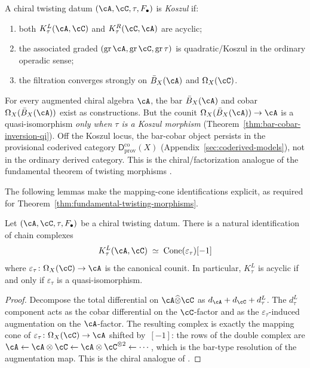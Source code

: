 \begin{definition}\label{def:chiral-koszul-morphism}
A chiral twisting datum $(\cA, \cC, \tau, F_\bullet)$ is
\emph{Koszul} if:
\begin{enumerate}
\item both $K_\tau^L(\cA,\cC)$ and $K_\tau^R(\cC,\cA)$ are acyclic;
\item the associated graded
  $(\operatorname{gr}\cA, \operatorname{gr}\cC, \operatorname{gr}\tau)$
  is quadratic/Koszul in the ordinary operadic sense;
\item the filtration converges strongly on $\bar{B}_X(\cA)$ and
  $\Omega_X(\cC)$.
\end{enumerate}
\end{definition}

\begin{remark}\label{rem:construction-vs-resolution}
For every augmented chiral algebra $\cA$, the bar
$\bar{B}_X(\cA)$ and cobar $\Omega_X(\bar{B}_X(\cA))$ exist as
constructions.  But the counit
$\Omega_X(\bar{B}_X(\cA)) \to \cA$ is a quasi-isomorphism
\emph{only when $\tau$ is a Koszul morphism}
(Theorem~\ref{thm:bar-cobar-inversion-qi}).
Off the Koszul locus, the bar-cobar object persists in the
provisional coderived category
$\mathsf{D}^{\mathrm{co}}_{\mathrm{prov}}(X)$
(Appendix~\ref{sec:coderived-models}),
not in the ordinary derived category.
This is the chiral/factorization analogue of the fundamental
theorem of twisting morphisms \cite[Theorem~2.3.1]{LV12}.
\end{remark}

The following lemmas make the mapping-cone identifications
explicit, as required for Theorem~\ref{thm:fundamental-twisting-morphisms}.

\begin{lemma}
\label{lem:twisted-product-cone-counit}
Let $(\cA, \cC, \tau, F_\bullet)$ be a chiral twisting datum.
There is a natural identification of chain complexes
\[
K_\tau^L(\cA,\cC) \;\simeq\; \operatorname{Cone}(\varepsilon_\tau)[-1]
\]
where $\varepsilon_\tau\colon \Omega_X(\cC) \to \cA$ is the
canonical counit.  In particular, $K_\tau^L$ is acyclic if and
only if $\varepsilon_\tau$ is a quasi-isomorphism.
\end{lemma}

\begin{proof}
Decompose the total differential on $\cA \widehat{\otimes} \cC$
as $d_\cA + d_\cC + d_\tau^L$.  The $d_\tau^L$ component acts as
the cobar differential on the $\cC$-factor and as the
$\varepsilon_\tau$-induced augmentation on the $\cA$-factor.
The resulting complex is exactly the mapping cone of
$\varepsilon_\tau\colon \Omega_X(\cC) \to \cA$ shifted by~$[-1]$:
the rows of the double complex are
$\cA \leftarrow \cA \otimes \cC \leftarrow \cA \otimes \cC^{\otimes 2}
\leftarrow \cdots$, which is the bar-type resolution of the
augmentation map.  This is the chiral analogue of
\cite[Lemma~2.2.5]{LV12}.
\end{proof}

